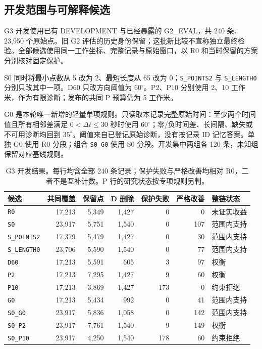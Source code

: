 \subsection{开发范围与可解释候选}
G3 开发使用已有 DEVELOPMENT 与已经暴露的 G2\_EVAL，共 240 条、23,950 个原始点。旧 G2 评估的历史身份保留；这批新比较不宣称独立最终检验。全部候选使用同一工作坐标、完整记录与原始窗口，以 R0 和当时保留的方案分别核对固定保护。

S0 同时将最小点数从 5 改为 2、最短长度从 65 改为 0；\texttt{S\_POINTS2} 与 \texttt{S\_LENGTH0} 分别只改其中一项。D60 只改方向阈值为 $60^\circ$。P2、P10 分别使用 2、10 工作米，作为有限诊断；发布的共同 P 预算仍为 5 工作米。

G0 是本轮唯一新增的轻量单项规则。只读取本记录完整原始时间：至少两个时间值且所有相邻差满足 $0<\Delta t\le30$ 秒时使用 $60^\circ$；零/负时间差、长间隔、缺失或不可用诊断均回到 $35^\circ$。阈值来自已登记原始诊断，没有按记录 ID 记忆答案。单独 G0 使用 R0 分段；组合 \texttt{S0\_G0} 使用 S0 分段。开发集中两组各 120 条，未知组保留对应基线规则。

\begin{table}[H]\centering\small
\caption{G3 开发结果。每行均含全部 240 条记录；保护失败与严格改善均相对 R0，二者不是互补计数。P 行的研究状态按专项规则另判。}
\begin{tabularx}{\linewidth}{@{}lrrrrrY@{}}\toprule 候选 & 共同覆盖 & 保留点 & D 删除 & 保护失败 & 严格改善 & 整链状态 \\ \midrule
\texttt{R0} & 17,213 & 5,349 & 1,427 & 0 & 0 & 未证实收益 \\
\texttt{S0} & 23,917 & 5,751 & 1,540 & 0 & 107 & 范围内支持 \\
\texttt{S\_POINTS2} & 17,379 & 5,479 & 1,427 & 0 & 30 & 范围内支持 \\
\texttt{S\_LENGTH0} & 23,706 & 5,590 & 1,540 & 0 & 77 & 范围内支持 \\
\texttt{D60} & 17,213 & 5,591 & 605 & 3 & 97 & 权衡 \\
\texttt{P2} & 17,213 & 7,295 & 1,427 & 9 & 60 & 权衡 \\
\texttt{P10} & 17,213 & 3,869 & 1,427 & 173 & 0 & 约束拒绝 \\
\texttt{G0} & 17,213 & 5,434 & 992 & 0 & 41 & 范围内支持 \\
\texttt{S0\_G0} & 23,917 & 5,836 & 1,058 & 0 & 142 & 范围内支持 \\
\texttt{S0\_P2} & 23,917 & 7,761 & 1,540 & 9 & 149 & 权衡 \\
\texttt{S0\_P10} & 23,917 & 4,250 & 1,540 & 178 & 60 & 约束拒绝 \\
\bottomrule\end{tabularx}\end{table}

